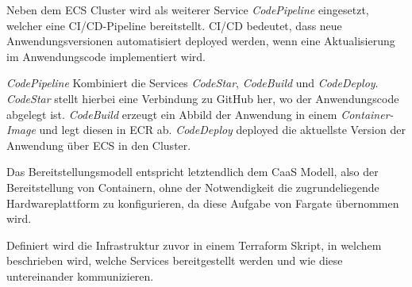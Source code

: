 Neben dem \ac{ECS} Cluster wird als weiterer Service \textit{\gls{CodePipeline}} eingesetzt, welcher eine \ac{CI/CD}-Pipeline bereitstellt. \ac{CI/CD} bedeutet, dass neue Anwendungsversionen automatisiert deployed werden, wenn eine Aktualisierung im Anwendungscode implementiert wird. 

\textit{\gls{CodePipeline}} Kombiniert die Services \textit{CodeStar}, \textit{CodeBuild} und \textit{CodeDeploy}. \textit{CodeStar} stellt hierbei eine Verbindung zu \gls{GitHub} her, wo der Anwendungscode abgelegt ist. \textit{CodeBuild} erzeugt ein Abbild der Anwendung in einem \textit{Container-Image} und legt diesen in \ac{ECR} ab. \textit{CodeDeploy} deployed die aktuellste Version der Anwendung über \ac{ECS} in den Cluster.

Das Bereitstellungsmodell entspricht letztendlich dem \ac{CaaS} Modell, also der Bereitstellung von Containern, ohne der Notwendigkeit die zugrundeliegende Hardwareplattform zu konfigurieren, da diese Aufgabe von \gls{Fargate} übernommen wird.

Definiert wird die Infrastruktur zuvor in einem \gls{Terraform} Skript, in welchem beschrieben wird, welche Services bereitgestellt werden und wie diese untereinander kommunizieren.